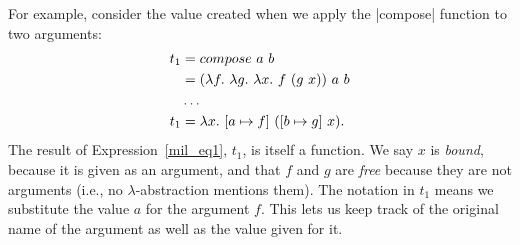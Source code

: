 \documentclass[12pt]{report}
\begin{document}
For example, consider the value created when we apply the |compose|
function to two arguments:
\begin{equation}
  \begin{split}
    t_1 &= compose\ a\ b \\
    &= (\lambda f.\ \lambda g.\ \lambda x.\ f\ (g\ x))\ a\ b \\
    & \dots \\
    t_1 &= \lambda x.\ [a \mapsto f]\ ([b \mapsto g]\ x).
  \end{split}\label{mil_eq1}
\end{equation}
The result of Expression~\eqref{mil_eq1}, $t_1$, is itself a
function. We say $x$ is \emph{bound},
because it is given as an argument, and that $f$ and $g$ are
\emph{free} because they are not arguments (i.e., no
$\lambda$-abstraction mentions them). The notation  in
$t_1$ means we substitute the value $a$ for the argument $f$. This
lets us keep track of the original name of the argument as well as the
value given for it.
\end{document}
